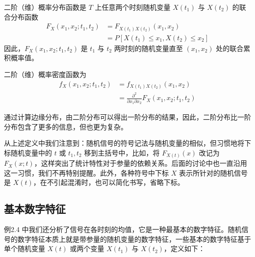 \documentclass[11pt,openany,UTF8]{ctexbook}
\begin{document}
二阶（维\nobreak）概率分布函数是 $T$ 上任意两个时刻随机变量 $X(t_1)$ 与 $X(t_2)$ 的联合分布函数
\[
  \begin{aligned}
    F_X(x_1,x_2;t_1,t_2)&=F_{X(t_1)X(t_2)}(x_1,x_2)\\
    &=P[X(t_1)\leqslant x_1,X(t_2)\leqslant x_2]
  \end{aligned}
\]
因此\nobreak，$F_X(x_1,x_2;t_1,t_2)$ 是 $t_1$ 与 $t_2$ 两时刻的随机变量直至 $(x_1,x_2)$ 处的联合累积概率值\nobreak。

二阶（维\nobreak）概率密度函数为
\[
  \begin{aligned}
    f_X(x_1,x_2;t_1,t_2)&=f_{X(t_1)X(t_2)}(x_1,x_2)\\
    &=\frac{\partial^2}{\partial x_1\partial x_2}F_X(x_1,x_2;t_1,t_2)
  \end{aligned}
\]

通过计算边缘分布\nobreak，由二阶分布可以得出一阶分布的结果\nobreak，因此\nobreak，二阶分布比一阶分布包含了更多的信息\nobreak，但也更为复杂\nobreak。

从上述定义中我们注意到\nobreak：随机信号的符号记法与随机变量的相似\nobreak，但习惯地将下标随机变量中的 $t$ 或 $t_1,t_2$ 移到主括号中\nobreak，比如\nobreak，将 $F_{X(t)}(x)$ 改记为 $F_X(x;t)$\nobreak，这样突出了统计特性对于参量的依赖关系\nobreak。后面的讨论中也一直沿用这一习惯\nobreak，我们不再特别提醒\nobreak。此外\nobreak，各种符号中下标 $X$ 表示所针对的随机信号是 $X(t)$\nobreak，在不引起混淆时\nobreak，也可以简化书写\nobreak，省略下标\nobreak。

\subsection{基本数字特征}
例2.4 中我们还分析了信号在各时刻的均值\nobreak，它是一种最基本的数字特征\nobreak。随机信号的数字特征本质上就是带参量的随机变量的数字特征\nobreak，一些基本的数字特征基于单个随机变量 $X(t)$ 或两个变量 $X(t_1)$ 与 $X(t_2)$\nobreak，定义如下\nobreak：
\end{document}
